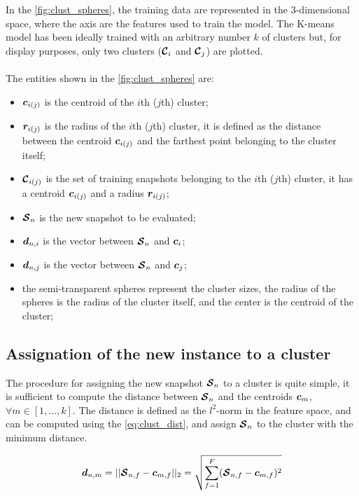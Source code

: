 In the \autoref{fig:clust_spheres}, the training data are represented in the $3$-dimensional space, where the axis are the features used to train the model. The K-means model has been ideally trained with an arbitrary number $k$ of clusters but, for display purposes, only two clusters  ($\bm{\mathcal{C}}_i$ and $\bm{\mathcal{C}}_j$) are plotted. 
\paragraph*{}
The entities shown in the \autoref{fig:clust_spheres} are:
\begin{itemize}
  \item $\bm{c}_{i(j)}$ is the centroid of the $i$th ($j$th) cluster;
  \item $\bm{r}_{i(j)}$ is the radius of the $i$th ($j$th) cluster, it is defined as the distance between the centroid $\bm{c}_{i(j)}$ and the farthest point belonging to the cluster itself;
  \item $\bm{\mathcal{C}}_{i(j)}$ is the set of training snapshots belonging to the $i$th ($j$th) cluster, it has a centroid $\bm{c}_{i(j)}$ and a radius $\bm{r}_{i(j)}$;
  \item $\bm{\mathcal{S}}_n$ is the new snapshot to be evaluated;
  \item $\bm{d}_{n,i}$ is the vector between $\bm{\mathcal{S}}_n$ and $\bm{c}_i$;
  \item $\bm{d}_{n,j}$ is the vector between $\bm{\mathcal{S}}_n$ and $\bm{c}_j$;
  \item the semi-transparent spheres represent the cluster sizes, the radius of the spheres is the radius of the cluster itself, and the center is the centroid of the cluster;
\end{itemize}

\subsection{Assignation of the new instance to a cluster} 
The procedure for assigning the new snapshot $\bm{\mathcal{S}}_n$ to a cluster is quite simple, it is sufficient to compute the distance between $\bm{\mathcal{S}}_n$ and the centroids $\bm{c}_m$, $\forall m \in  [1, \dots , k]$. The distance is defined as the $l^2$-norm in the feature space, and can be computed using the \autoref{eq:clust_dist}, and assign $\bm{\mathcal{S}}_n$ to the cluster with the minimum distance.

\begin{equation}
  \label{eq:clust_dist}
  \bm{d}_{n,m} = ||\bm{\mathcal{S}}_{n,f} - \bm{c}_{m,f}||_2 = \sqrt{\sum_{f=1}^{F} (\bm{\mathcal{S}}_{n,f} - \bm{c}_{m,f})^2}
\end{equation}

